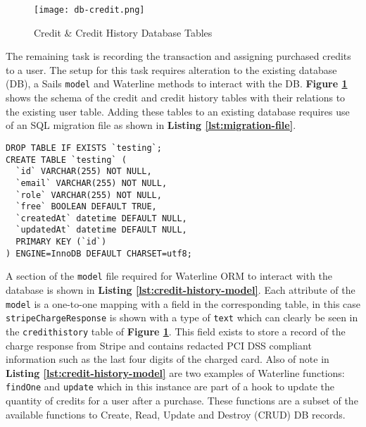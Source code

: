 \begin{figure}[!hbt]
  	\centering
 	\texttt{[image: db-credit.png]}
  	\caption{Credit \& Credit History Database Tables}
 	\label{fig:db-credit}
\end{figure}

The remaining task is recording the transaction and assigning purchased credits to a user. The setup for this task requires alteration to the existing database (DB), a Sails \texttt{model} and Waterline methods to interact with the DB. \textbf{Figure \ref{fig:db-credit}} shows the schema of the credit and credit history tables with their relations to the existing user table. Adding these tables to an existing database requires use of an SQL migration file as shown in \textbf{Listing \ref{lst:migration-file}}.\\

\hspace{0.1\textwidth}
\begin{minipage}{.72\textwidth}
\begin{lstlisting}[caption=Section Of Migration File: v0.9.0-v0.10.0.sql, label={lst:migration-file}]
DROP TABLE IF EXISTS `testing`;
CREATE TABLE `testing` (
  `id` VARCHAR(255) NOT NULL,
  `email` VARCHAR(255) NOT NULL,
  `role` VARCHAR(255) NOT NULL,
  `free` BOOLEAN DEFAULT TRUE,
  `createdAt` datetime DEFAULT NULL,
  `updatedAt` datetime DEFAULT NULL,
  PRIMARY KEY (`id`)
) ENGINE=InnoDB DEFAULT CHARSET=utf8;
\end{lstlisting}
\end{minipage}
\hspace{0.1\textwidth}

A section of the \texttt{model} file required for Waterline ORM to interact with the database is shown in \textbf{Listing \ref{lst:credit-history-model}}. Each attribute of the \texttt{model} is a one-to-one mapping with a field in the corresponding table, in this case \texttt{stripeChargeResponse} is shown with a type of \texttt{text} which can clearly be seen in the \texttt{credithistory} table of \textbf{Figure \ref{fig:db-credit}}. This field exists to store a record of the charge response from Stripe and contains redacted PCI DSS compliant information such as the last four digits of the charged card. Also of note in \textbf{Listing \ref{lst:credit-history-model}} are two examples of Waterline functions: \texttt{findOne} and \texttt{update} which in this instance are part of a hook to update the quantity of credits for a user after a purchase. These functions are a subset of the available functions to Create, Read, Update and Destroy (CRUD) DB records.

